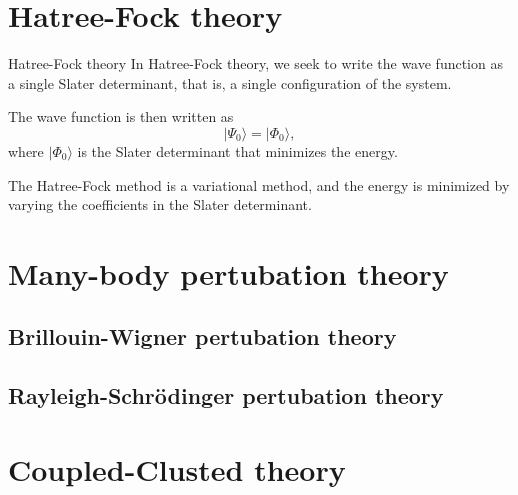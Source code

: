 \documentclass[UKenglish,aspectratio=169]{beamer}
\begin{document}
\section{Hatree-Fock theory}

\begin{frame}{Hatree-Fock theory}
    In Hatree-Fock theory, we seek to write the wave function as a single Slater determinant, that is, a single configuration of the system.

    \bigskip

    The wave function is then written as
    \begin{equation}
        \lvert \Psi_0 \rangle = \lvert \Phi_0 \rangle,
    \end{equation}
    where $\lvert \Phi_0 \rangle$ is the Slater determinant that minimizes the energy.

    \bigskip

    The Hatree-Fock method is a variational method, and the energy is minimized by varying the coefficients in the Slater determinant.
\end{frame}

\section{Many-body pertubation theory}
\subsection{Brillouin-Wigner pertubation theory}
\subsection{Rayleigh-Schrödinger pertubation theory}

\section{Coupled-Clusted theory}
\end{document}
